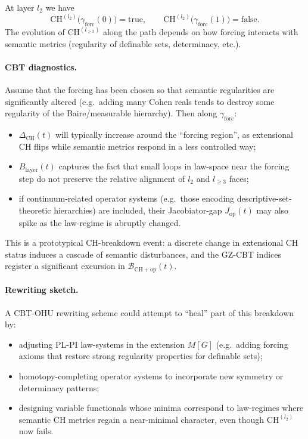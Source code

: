 \documentclass[11pt]{book}
\theoremstyle{plain}
\theoremstyle{definition}
\begin{document}
At layer $l_2$ we have
\[
  \mathrm{CH}^{(l_2)}\bigl(\gamma_{\mathrm{forc}}(0)\bigr)=\text{true},
  \qquad
  \mathrm{CH}^{(l_2)}\bigl(\gamma_{\mathrm{forc}}(1)\bigr)=\text{false}.
\]
The evolution of $\mathrm{CH}^{(l_{\ge3})}$ along the path depends on
how forcing interacts with semantic metrics (regularity of definable
sets, determinacy, etc.).

\paragraph{CBT diagnostics.}

Assume that the forcing has been chosen so that semantic regularities
are significantly altered (e.g.\ adding many Cohen reals tends to
destroy some regularity of the Baire/measurable hierarchy). Then along
$\gamma_{\mathrm{forc}}$:

\begin{itemize}
  \item $\Delta_{\mathrm{CH}}(t)$ will typically increase around the
        “forcing region”, as extensional CH flips while semantic
        metrics respond in a less controlled way;
  \item $B_{\mathrm{layer}}(t)$ captures the fact that small loops in
        law-space near the forcing step do not preserve the relative
        alignment of $l_2$ and $l_{\ge3}$ faces;
  \item if continuum-related operator systems (e.g.\ those encoding
        descriptive-set-theoretic hierarchies) are included, their
        Jacobiator-gap $J_{\mathrm{op}}(t)$ may also spike as the
        law-regime is abruptly changed.
\end{itemize}

This is a prototypical CH-breakdown event: a discrete change in
extensional CH status induces a cascade of semantic disturbances, and
the GZ-CBT indices register a significant excursion in
$\mathcal{B}_{\mathrm{CH+op}}(t)$.

\paragraph{Rewriting sketch.}

A CBT-OHU rewriting scheme could attempt to “heal” part of this
breakdown by:

\begin{itemize}
  \item adjusting PL-PI law-systems in the extension $M[G]$ (e.g.\
        adding forcing axioms that restore strong regularity properties
        for definable sets);
  \item homotopy-completing operator systems to incorporate new
        symmetry or determinacy patterns;
  \item designing variable functionals whose minima correspond to
        law-regimes where semantic CH metrics regain a near-minimal
        character, even though $\mathrm{CH}^{(l_2)}$ now fails.
\end{itemize}
\end{document}
